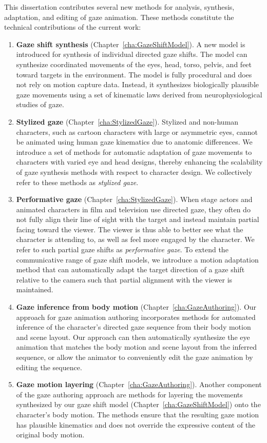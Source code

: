This dissertation contributes several new methods for analysis, synthesis, adaptation, and editing of gaze animation. These methods constitute the technical contributions of the current work:

\begin{enumerate}
\item \textbf{Gaze shift synthesis} (Chapter~\ref{cha:GazeShiftModel}). A new model is introduced for synthesis of individual directed gaze shifts. The model can synthesize coordinated movements of the eyes, head, torso, pelvis, and feet toward targets in the environment. The model is fully procedural and does not rely on motion capture data. Instead, it synthesizes biologically plausible gaze movements using a set of kinematic laws derived from neurophysiological studies of gaze.
\item \textbf{Stylized gaze} (Chapter~\ref{cha:StylizedGaze}). Stylized and non-human characters, such as cartoon characters with large or asymmetric eyes, cannot be animated using human gaze kinematics due to anatomic differences. We introduce a set of methods for automatic adaptation of gaze movements to characters with varied eye and head designs, thereby enhancing the scalability of gaze synthesis methods with respect to character design. We collectively refer to these methods as \emph{stylized gaze}.
\item \textbf{Performative gaze} (Chapter~\ref{cha:StylizedGaze}). When stage actors and animated characters in film and television use directed gaze, they often do not fully align their line of sight with the target and instead maintain partial facing toward the viewer. The viewer is thus able to better see what the character is attending to, as well as feel more engaged by the character. We refer to such partial gaze shifts as \emph{performative gaze}. To extend the communicative range of gaze shift models, we introduce a motion adaptation method that can automatically adapt the target direction of a gaze shift relative to the camera such that partial alignment with the viewer is maintained.
\item \textbf{Gaze inference from body motion} (Chapter~\ref{cha:GazeAuthoring}). Our approach for gaze animation authoring incorporates methods for automated inference of the character's directed gaze sequence from their body motion and scene layout. Our approach can then automatically synthesize the eye animation that matches the body motion and scene layout from the inferred sequence, or allow the animator to conveniently edit the gaze animation by editing the sequence.
\item \textbf{Gaze motion layering} (Chapter~\ref{cha:GazeAuthoring}). Another component of the gaze authoring approach are methods for layering the movements synthesized by our gaze shift model (Chapter~\ref{cha:GazeShiftModel}) onto the character's body motion. The methods ensure that the resulting gaze motion has plausible kinematics and does not override the expressive content of the original body motion.
\end{enumerate}

